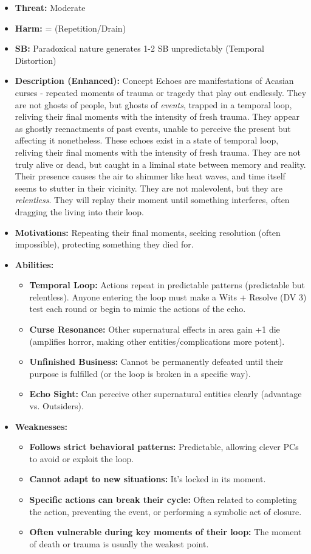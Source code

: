 \documentclass[11pt]{article}
\begin{document}
\begin{itemize}
\item \textbf{Threat:} Moderate
\item \textbf{Harm:} = (Repetition/Drain)
\item \textbf{SB:} Paradoxical nature generates 1-2 SB unpredictably (Temporal Distortion)
\item \textbf{Description (Enhanced):} Concept Echoes are manifestations of Acasian curses - repeated moments of trauma or tragedy that play out endlessly. They are not ghosts of people, but ghosts of \textit{events}, trapped in a temporal loop, reliving their final moments with the intensity of fresh trauma. They appear as ghostly reenactments of past events, unable to perceive the present but affecting it nonetheless. These echoes exist in a state of temporal loop, reliving their final moments with the intensity of fresh trauma. They are not truly alive or dead, but caught in a liminal state between memory and reality. Their presence causes the air to shimmer like heat waves, and time itself seems to stutter in their vicinity. They are not malevolent, but they are \textit{relentless}. They will replay their moment until something interferes, often dragging the living into their loop.
\item \textbf{Motivations:} Repeating their final moments, seeking resolution (often impossible), protecting something they died for.
\item \textbf{Abilities:}
\begin{itemize}
\item \textbf{Temporal Loop:} Actions repeat in predictable patterns (predictable but relentless). Anyone entering the loop must make a Wits + Resolve (DV 3) test each round or begin to mimic the actions of the echo.
\item \textbf{Curse Resonance:} Other supernatural effects in area gain +1 die (amplifies horror, making other entities/complications more potent).
\item \textbf{Unfinished Business:} Cannot be permanently defeated until their purpose is fulfilled (or the loop is broken in a specific way).
\item \textbf{Echo Sight:} Can perceive other supernatural entities clearly (advantage vs. Outsiders).
\end{itemize}
\item \textbf{Weaknesses:}
\begin{itemize}
\item \textbf{Follows strict behavioral patterns:} Predictable, allowing clever PCs to avoid or exploit the loop.
\item \textbf{Cannot adapt to new situations:} It's locked in its moment.
\item \textbf{Specific actions can break their cycle:} Often related to completing the action, preventing the event, or performing a symbolic act of closure.
\item \textbf{Often vulnerable during key moments of their loop:} The moment of death or trauma is usually the weakest point.
\end{itemize}
\end{itemize}
\end{document}
